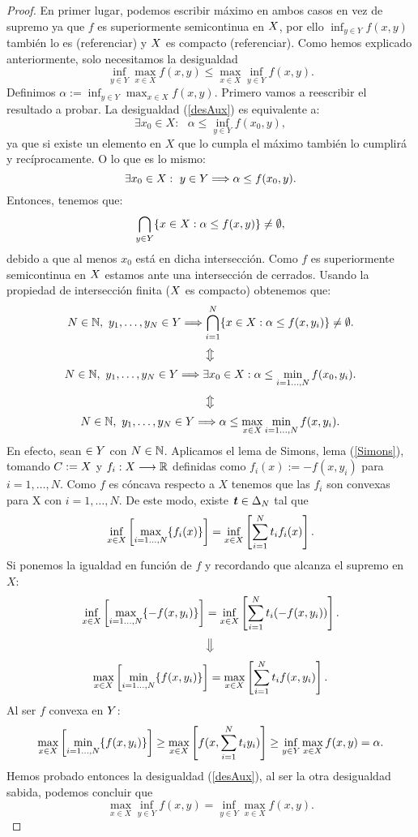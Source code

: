 \begin{proof}
En primer lugar, podemos escribir máximo en ambos casos en vez de supremo ya que $ f $ es superiormente semicontinua en $ X $, por ello $ \inf_{y \in Y} f(x,y) $ también lo es (referenciar) y $ X $ es compacto (referenciar). Como hemos explicado anteriormente, solo necesitamos la desigualdad 
\begin{equation*}
\inf_{y \in Y} \max_{x \in X} f(x,y) \leq \max_{x \in X} \inf_{y \in Y} f(x,y).
\end{equation*}  Definimos $ \alpha := \inf_{y \in Y} \max_{x \in X} f(x,y) $. Primero vamos a reescribir el resultado a probar. La desigualdad (\ref{desAux}) es equivalente a:\\
\[
\exists x_0 \in X:\text{ }\alpha \leq \inf_{y \in Y} f(x_0,y),
\]
ya que si existe un elemento en $ X $ que lo cumpla el máximo también lo cumplirá y recíprocamente. O lo que es lo mismo:
\[
\exists x_0 \in X:\text{ }y \in Y \Longrightarrow \alpha \leq f(x_0,y).
\]
Entonces, tenemos que:
\[
\bigcap_{y\in Y}\{x \in X: \alpha \leq f(x, y) \} \neq \emptyset,
\]
debido a que al menos $ x_0 $ está en dicha intersección. Como $ f $ es superiormente semicontinua en $ X $ estamos ante una intersección de cerrados. Usando la propiedad de intersección finita ($ X $ es compacto) obtenemos que:
\[
N\in\mathbb{N}, \text{ }y_1,\dots,y_N \in Y \Longrightarrow \bigcap_{i=1}^{N}\{x \in X: \alpha \leq f(x, y_i) \} \neq \emptyset.
\]
\[
\big\Updownarrow
\]
\[
N\in\mathbb{N}, \text{ }y_1,\dots,y_N \in Y \Longrightarrow \exists x_0\in X:\alpha \leq \min_{i=1\dots,N }f(x_0,y_i).
\]
\[
\big\Updownarrow
\]
\begin{equation}\label{desAux}
N\in\mathbb{N}, \text{ }y_1,\dots,y_N \in Y \Longrightarrow \alpha \leq \max_{x \in X} \min_{i=1\dots,N }f(x,y_i).
\end{equation}
En efecto, sean $ \in Y$ con $ N \in \mathbb{N} $. Aplicamos el lema de Simons, lema (\ref{Simons}), tomando $ C := X $ y $ f_i: X \longrightarrow \mathbb{R} $ definidas como $ f_i(x):=-f(x,y_i) $ para $ i=1,\dots,N $. Como $ f $ es cóncava respecto a $ X $ tenemos que las $ f_i $ son convexas para X con $  i=1,\dots,N $. De este modo, existe $ \textbf{\emph{t}} \in \Delta_N$ tal que
\[
\inf_{x \in X}\left[ \max_{i=1\dots,N } \{f_i(x)\}\right] = \inf_{x \in X} \left[ \sum_{i=1}^{N} t_i f_i(x) \right].
\] 
Si ponemos la igualdad en función de $ f $ y recordando que alcanza el supremo en $ X $:
\[
\inf_{x \in X}\left[ \max_{i=1\dots,N } \{-f(x,y_i)\}\right] = \inf_{x \in X} \left[ \sum_{i=1}^{N} t_i (-f(x,y_i)) \right]. 
\] 
\[
\big\Downarrow
\]
\[
\max_{x \in X}\left[ \min_{i=1\dots,N } \{f(x,y_i)\}\right] = \max_{x \in X} \left[ \sum_{i=1}^{N} t_i f(x,y_i) \right]. 
\] 
Al ser $ f $ convexa en $ Y $:
\[
\max_{x \in X}\left[ \min_{i=1\dots,N } \{f(x,y_i)\}\right] \geq \max_{x \in X} \left[ f(x,\sum_{i=1}^{N} t_i y_i) \right] \geq \inf_{y \in Y} \max_{x \in X} f(x,y)= \alpha.
\]
Hemos probado entonces la desigualdad (\ref{desAux}), al ser la otra desigualdad sabida, podemos concluir que
\[
\max_{x \in X} \inf_{y \in Y} f(x,y) = \inf_{y \in Y} \max_{x \in X} f(x,y).
\]
\end{proof}
